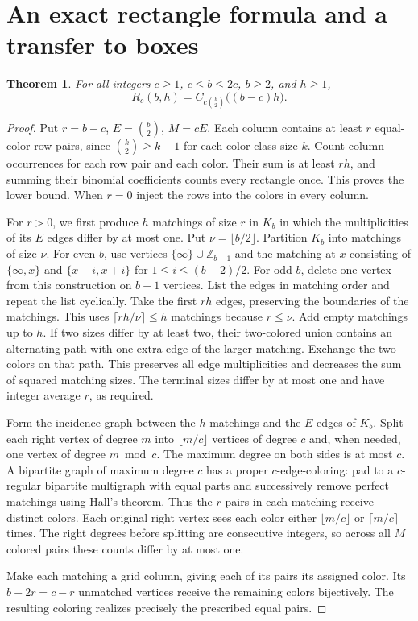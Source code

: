\documentclass[11pt]{article}
\newtheorem{theorem}{Theorem}
\newcommand{\Z}{\mathbb Z}
\begin{document}
\section{An exact rectangle formula and a transfer to boxes}
\begin{theorem}\label{t:color}
For all integers $c\ge1$, $c\le b\le2c$, $b\ge2$, and $h\ge1$,
\[
 R_c(b,h)= C_{c\binom b2}\bigl((b-c)h\bigr).
\]
\end{theorem}
\begin{proof}
Put $r=b-c$, $E=\binom b2$, $M=cE$. Each column contains at least $r$ equal-color row pairs, since $\binom k2\ge k-1$ for each color-class size $k$. Count column occurrences for each row pair and each color. Their sum is at least $rh$, and summing their binomial coefficients counts every rectangle once. This proves the lower bound. When $r=0$ inject the rows into the colors in every column.

For $r>0$, we first produce $h$ matchings of size $r$ in $K_b$ in which the multiplicities of its $E$ edges differ by at most one. Put $\nu=\lfloor b/2\rfloor$. Partition $K_b$ into matchings of size $\nu$. For even $b$, use vertices $\{\infty\}\cup\Z_{b-1}$ and the matching at $x$ consisting of $\{\infty,x\}$ and $\{x-i,x+i\}$ for $1\le i\le (b-2)/2$. For odd $b$, delete one vertex from this construction on $b+1$ vertices. List the edges in matching order and repeat the list cyclically. Take the first $rh$ edges, preserving the boundaries of the matchings. This uses $\lceil rh/\nu\rceil\le h$ matchings because $r\le\nu$. Add empty matchings up to $h$. If two sizes differ by at least two, their two-colored union contains an alternating path with one extra edge of the larger matching. Exchange the two colors on that path. This preserves all edge multiplicities and decreases the sum of squared matching sizes. The terminal sizes differ by at most one and have integer average $r$, as required.

Form the incidence graph between the $h$ matchings and the $E$ edges of $K_b$. Split each right vertex of degree $m$ into $\lfloor m/c\rfloor$ vertices of degree $c$ and, when needed, one vertex of degree $m\bmod c$. The maximum degree on both sides is at most $c$. A bipartite graph of maximum degree $c$ has a proper $c$-edge-coloring: pad to a $c$-regular bipartite multigraph with equal parts and successively remove perfect matchings using Hall's theorem. Thus the $r$ pairs in each matching receive distinct colors. Each original right vertex sees each color either $\lfloor m/c\rfloor$ or $\lceil m/c\rceil$ times. The right degrees before splitting are consecutive integers, so across all $M$ colored pairs these counts differ by at most one.

Make each matching a grid column, giving each of its pairs its assigned color. Its $b-2r=c-r$ unmatched vertices receive the remaining colors bijectively. The resulting coloring realizes precisely the prescribed equal pairs.
\end{proof}
\end{document}
